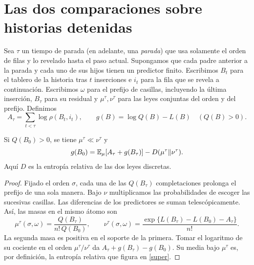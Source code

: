 \section{Las dos comparaciones sobre historias detenidas}\label{historias}
Sea $\tau$ un tiempo de parada (en adelante, una \emph{parada}) que usa solamente el orden de filas
y lo revelado hasta el paso actual.
Supongamos que cada padre anterior a la parada y cada uno de sus hijos tienen un predictor finito.
Escribimos $B_t$ para el tablero de la historia tras $t$ inserciones e $i_t$ para la fila que se
revela a continuación. Escribimos $\omega$ para el prefijo de casillas, incluyendo la última
inserción, $B_\tau$ para su residual y $\mu^\tau,\nu^\tau$ para las leyes conjuntas del orden y del
prefijo. Definimos
\[
 A_\tau=\sum_{t<\tau}\log\rho(B_t,i_t),\qquad g(B)=\log Q(B)-L(B)\quad(Q(B)>0).
\]

\begin{lema}\label{hist:igualdad}
Si $Q(B_0)>0$, se tiene $\mu^\tau\ll\nu^\tau$ y
\begin{equation}\label{super}
 g(B_0)=\mathbb{E}_\mu[A_\tau+g(B_\tau)]-D(\mu^\tau\Vert\nu^\tau).
\end{equation}
Aquí $D$ es la entropía relativa de las dos leyes discretas.
\end{lema}
\begin{proof}
Fijado el orden $\sigma$, cada una de las $Q(B_\tau)$ completaciones prolonga el prefijo de
una sola manera. Bajo $\nu$ multiplicamos las probabilidades de escoger las sucesivas casillas.
Las diferencias de los predictores se suman telescópicamente. Así, las masas en el mismo átomo son
\[
 \mu^\tau(\sigma,\omega)=\frac{Q(B_\tau)}{n!\,Q(B_0)},\qquad
 \nu^\tau(\sigma,\omega)=\frac{\exp\{L(B_\tau)-L(B_0)-A_\tau\}}{n!}.
\]
La segunda masa es positiva en el soporte de la primera. Tomar el logaritmo de su cociente
en el orden $\mu^\tau/\nu^\tau$ da $A_\tau+g(B_\tau)-g(B_0)$. Su media bajo $\mu^\tau$
es, por definición, la entropía relativa que figura en \eqref{super}.
\end{proof}

